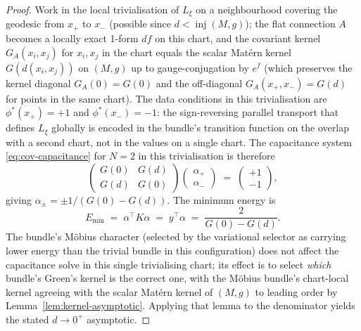 \documentclass[10pt,a4paper]{amsart}
\newcommand{\Connection}{A}
\newcommand{\inj}{\operatorname{inj}}      %
\begin{document}
\begin{proof}
Work in the local trivialisation of $L_\xi$ on a neighbourhood
covering the geodesic from $x_+$ to $x_-$ (possible since
$d<\inj(M,g)$); the flat connection $\Connection$ becomes a locally
exact 1-form $df$ on this chart, and the covariant kernel
$G_A(x_i,x_j)$ for $x_i,x_j$ in the chart equals the scalar Mat\'ern
kernel $G(d(x_i,x_j))$ on $(M,g)$ up to gauge-conjugation by $e^f$
(which preserves the kernel diagonal $G_A(0)=G(0)$ and the off-diagonal
$G_A(x_+,x_-)=G(d)$ for points in the same chart). The data
conditions in this trivialisation are $\phi^*(x_+)=+1$ and
$\phi^*(x_-)=-1$: the sign-reversing parallel transport that defines
$L_\xi$ globally is encoded in the bundle's transition function on
the overlap with a second chart, not in the values on a single chart.
The capacitance system \eqref{eq:cov-capacitance} for $N=2$ in this
trivialisation is therefore
\[
   \begin{pmatrix} G(0) & G(d) \\ G(d) & G(0) \end{pmatrix}
   \begin{pmatrix}\alpha_+\\\alpha_-\end{pmatrix}
   \;=\; \begin{pmatrix}+1\\-1\end{pmatrix},
\]
giving $\alpha_\pm=\pm 1/(G(0)-G(d))$. The minimum energy is
\[
   E_{\min} \;=\; \alpha^\top K\alpha
   \;=\; y^\top\alpha
   \;=\; \frac{2}{G(0)-G(d)}.
\]
The bundle's M\"obius character (selected by the variational
selector as carrying lower energy than the trivial bundle in this
configuration) does not affect the capacitance solve in this single
trivialising chart; its effect is to select \emph{which} bundle's
Green's kernel is the correct one, with the M\"obius bundle's
chart-local kernel agreeing with the scalar Mat\'ern kernel of
$(M,g)$ to leading order by Lemma~\ref{lem:kernel-asymptotic}.
Applying that lemma to the denominator yields the stated $d\to 0^+$
asymptotic.
\end{proof}
\end{document}
